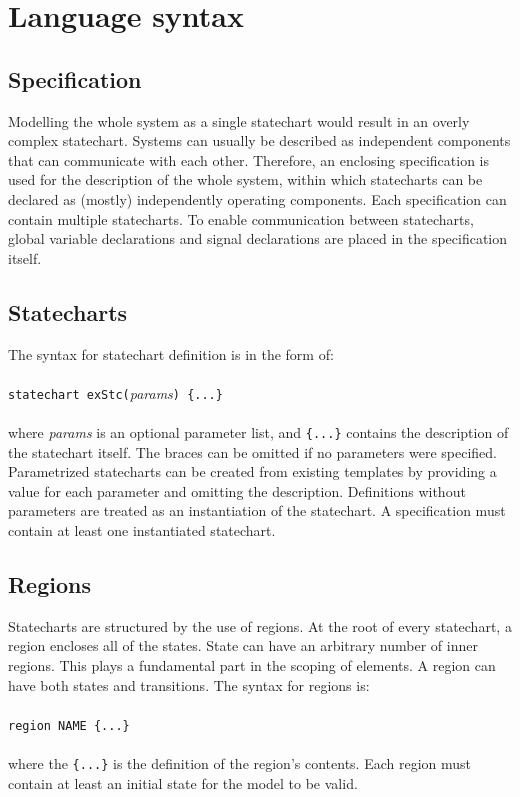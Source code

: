 \section{Language syntax}
  \subsection{Specification}
Modelling the whole system as a single statechart would result in an overly complex statechart. Systems can usually be described as independent components that can communicate with each other. Therefore, an enclosing specification is used for the description of the whole system, within which statecharts can be declared as (mostly) independently operating components. Each specification can contain multiple statecharts. To enable communication between statecharts, global variable declarations and signal declarations are placed in the specification itself.
  \subsection{Statecharts}
The syntax for statechart definition is in the form of:
\\\\\verb!statechart exStc(!\textit{params}\verb!) {...}!\\\\
where \textit{params} is an optional parameter list, and \verb!{...}! contains the description of the statechart itself. The braces can be omitted if no parameters were specified. Parametrized statecharts can be created from existing templates by providing a value for each parameter and omitting the description. Definitions without parameters are treated as an instantiation of the statechart. A specification must contain at least one instantiated statechart.
  \subsection{Regions}
Statecharts are structured by the use of regions. At the root of every statechart, a region encloses all of the states. State can have an arbitrary number of inner regions. This plays a fundamental part in the scoping of elements. A region can have both states and transitions. The syntax for regions is:
\\\\\verb!region NAME {...}!\\\\
where the \verb!{...}! is the definition of the region's contents. Each region must contain at least an initial state for the model to be valid.
